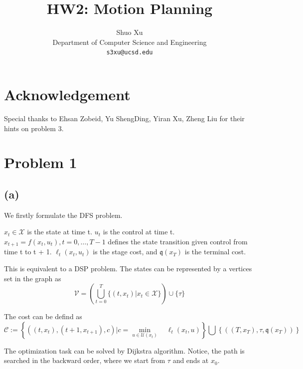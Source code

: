 \documentclass{article} %
\title{HW2: Motion Planning}
\author{
Shuo Xu \\
Department of Computer Science and Engineering \\
\texttt{s3xu@ucsd.edu} \\
}
\begin{document}
\maketitle

\begin{abstract}

\end{abstract}

\section*{Acknowledgement}
Special thanks to Ehsan Zobeid, Yu ShengDing, Yiran Xu, Zheng Liu for their hints on problem 3. 

\section{Problem 1}

\subsection{(a)}
We firstly formulate the DFS problem.

$x_t \in \mathcal{X}$ is the state at time t. $ u_{t}$ is the control at time t. $x_{t+1}=f\left(x_{t}, u_{t}\right), t=0, \ldots, T-1$ defines the state transition given control from time t to t + 1. $\ell_{t}\left(x_{t}, u_{t}\right)$ is the stage cost, and $\mathfrak{q}\left(x_{T}\right)$ is the terminal cost.

This is equivalent to a DSP problem. 
The states can be represented by a vertices set in the graph as 
$$ \mathcal{V} = (\bigcup_{t=0}^{T} \{ (t, x_t) | x_t \in \mathcal{X}\}) \cup \{\tau\}$$

The cost can be defind as 
$$\mathcal{C} :=\left\{\left(\left(t, x_{t}\right),\left(t+1, x_{t+1}\right), c\right) | c=\underset{u \in \mathcal{U}\left(x_{t}\right)}{\min } \quad \ell_{t}\left(x_{t}, u\right)\right\}\bigcup\left\{\left(\left(T, x_{T}\right), \tau, \mathfrak{q}\left(x_{T}\right)\right)\right\}$$

The optimization task can be solved by Dijkstra algorithm. Notice, the path is searched in the backward order, where we start from $\tau$ and ends at $x_0$.
\end{document}
